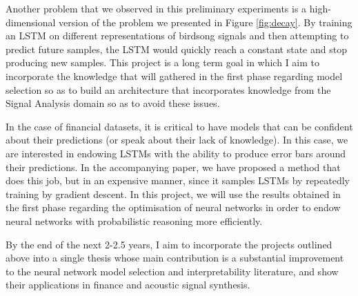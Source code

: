 \documentclass[pdftex,12pt,a4paper]{article}
\theoremstyle{definition}
\theoremstyle{remark}
\begin{document}
\par Another problem that we observed in this preliminary experiments is a high-dimensional version of the problem we presented in Figure \ref{fig:decay}. By training an LSTM on different representations of birdsong signals and then attempting to predict future samples, the LSTM would quickly reach a constant state and stop producing new samples. This project is a long term goal in which I aim to incorporate the knowledge that will gathered in the first phase regarding model selection so as to build an architecture that incorporates knowledge from the Signal Analysis domain so as to avoid these issues.

\par In the case of financial datasets, it is critical to have models that can be confident about their predictions (or speak about their lack of knowledge). In this case, we are interested in endowing LSTMs with the ability to produce error bars around their predictions. In the accompanying paper, we have proposed a method that does this job, but in an expensive manner, since it samples LSTMs by repeatedly training by gradient descent. In this project, we will use the results obtained in the first phase regarding the optimisation of neural networks in order to endow neural networks with probabilistic reasoning more efficiently.

\par By the end of the next 2-2.5 years, I aim to incorporate the projects outlined above into a single thesis whose main contribution is a substantial improvement to the neural network model selection and interpretability literature, and show their applications in finance and acoustic signal synthesis.



\end{document}
